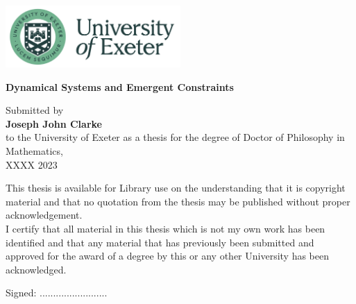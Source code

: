 \graphicspath{{figs/}}
\begin{titlepage}
        \begin{center}
        \vspace{1cm}
        \includegraphics[width=0.5\textwidth]{Exeter_logo.png}
        \Huge
        
        \vspace*{1.5cm}
        \textbf{Dynamical Systems and Emergent Constraints}
        \vspace{2cm}
        \large


        Submitted by\\
        \textbf{Joseph John Clarke}\\
        to the University of Exeter as a thesis for the degree of Doctor of Philosophy in Mathematics,\\
        XXXX 2023

        \vspace{2cm}
        \normalsize
        This thesis is available for Library use on the understanding that it is copyright
	material and that no quotation from the thesis may be published without proper
	acknowledgement.\\
	\vspace{1cm}
	I certify that all material in this thesis which is not my own work has been identified
	and that any material that has previously been submitted and approved for the award
	of a degree by this or any other University has been acknowledged.
	
	
	\vspace{1cm}
	Signed: .........................
        \end{center}
\end{titlepage}
